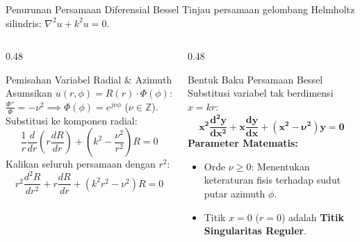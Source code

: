 \documentclass[aspectratio=169,10pt]{beamer}
\begin{document}
\begin{frame}{Penurunan Persamaan Diferensial Bessel}
  Tinjau persamaan gelombang Helmholtz silindris: $\nabla^2 u + k^2 u = 0$.
  \vspace{0.1cm}
  \begin{columns}[t]
    \begin{column}{0.48\textwidth}
      \begin{block}{Pemisahan Variabel Radial \& Azimuth}
        \small
        Asumsikan $u(r, \phi) = R(r) \cdot \Phi(\phi)$:\\
        $\frac{\Phi''}{\Phi} = -\nu^2 \implies \Phi(\phi) = e^{j\nu \phi}$ ($\nu \in \mathbb{Z}$).\\
        Substitusi ke komponen radial:
        \begin{equation*}
          \frac{1}{r}\frac{d}{dr}\left(r \frac{dR}{dr}\right) + \left(k^2 - \frac{\nu^2}{r^2}\right)R = 0
        \end{equation*}
        Kalikan seluruh persamaan dengan $r^2$:
        \begin{equation*}
          r^2 \frac{d^2 R}{dr^2} + r \frac{dR}{dr} + (k^2 r^2 - \nu^2)R = 0
        \end{equation*}
      \end{block}
    \end{column}
    \begin{column}{0.48\textwidth}
      \begin{alertblock}{Bentuk Baku Persamaan Bessel}
        \small
        Substitusi variabel tak berdimensi $x = kr$:
        \begin{equation*}
          \mathbf{x^2 \frac{d^2 y}{dx^2} + x \frac{dy}{dx} + (x^2 - \nu^2)y = 0}
        \end{equation*}
        \textbf{Parameter Matematis:}
        \begin{itemize}
          \item Orde $\nu \ge 0$: Menentukan keteraturan fisis terhadap sudut putar azimuth $\phi$.
          \item Titik $x = 0$ ($r = 0$) adalah \textbf{Titik Singularitas Reguler}.
        \end{itemize}
      \end{alertblock}
    \end{column}
  \end{columns}
\end{frame}
\end{document}
